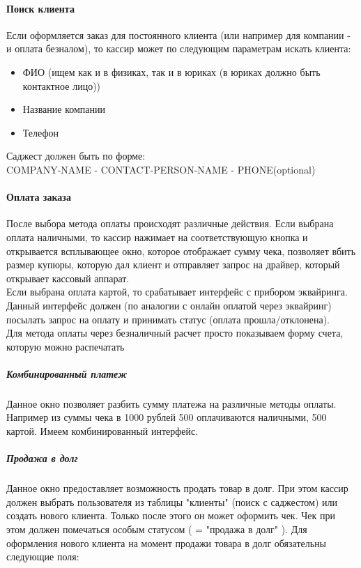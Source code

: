 \documentclass[DIV=calc, paper=a4, fontsize=11pt]{scrartcl} %
\begin{document}
\paragraph{Поиск клиента}
Если оформляется заказ для постоянного клиента (или например для компании - и оплата безналом), то кассир может по следующим параметрам искать клиента:

\begin{itemize}
	\item ФИО (ищем как и в физиках, так и в юриках (в юриках должно быть контактное лицо))
	\item Название компании
	\item Телефон
\end{itemize}

Саджест должен быть по форме:
\\COMPANY-NAME - CONTACT-PERSON-NAME - PHONE(optional)

\paragraph{Оплата заказа}
После выбора метода оплаты происходят различные действия. Если выбрана оплата наличными, то кассир нажимает на соответствующую кнопка и открывается всплывающее окно, которое отображает сумму чека, позволяет вбить размер купюры, которую дал клиент и отправляет запрос на драйвер, который открывает кассовый аппарат.
\\[0.5cm]
Если выбрана оплата картой, то срабатывает интерфейс с прибором эквайринга. Данный интерфейс должен (по аналогии с онлайн оплатой через эквайринг) посылать запрос на оплату и принимать статус (оплата прошла/отклонена).
\\[0.5cm]
Для метода оплаты через безналичный расчет просто показываем форму счета, которую можно распечатать 

\subparagraph{Комбинированный платеж}
Данное окно позволяет разбить сумму платежа на различные методы оплаты. Например из суммы чека в 1000 рублей 500 оплачиваются наличными, 500 картой. Имеем комбинированный интерфейс.

\subparagraph{Продажа в долг}
Данное окно предоставляет возможность продать товар в долг. При этом кассир должен выбрать пользователя из таблицы "клиенты" (поиск с саджестом) или создать нового клиента. Только после этого он может оформить чек. Чек при этом должен помечаться особым статусом ( = "продажа в долг" ). Для оформления нового клиента на момент продажи товара в долг обязательны следующие поля:
\end{document}
